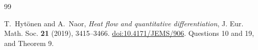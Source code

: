 \documentclass[11pt,a4paper]{article}
\theoremstyle{remark}
\begin{document}
\begin{thebibliography}{99}
\small
\setlength{\itemsep}{3pt}

T.~Hyt\"onen and A.~Naor,
\emph{Heat flow and quantitative differentiation},
J. Eur. Math. Soc. \textbf{21} (2019), 3415--3466.
\href{https://doi.org/10.4171/JEMS/906}{doi:10.4171/JEMS/906}.
Questions 10 and 19, and Theorem 9.
\end{thebibliography}
\end{document}
